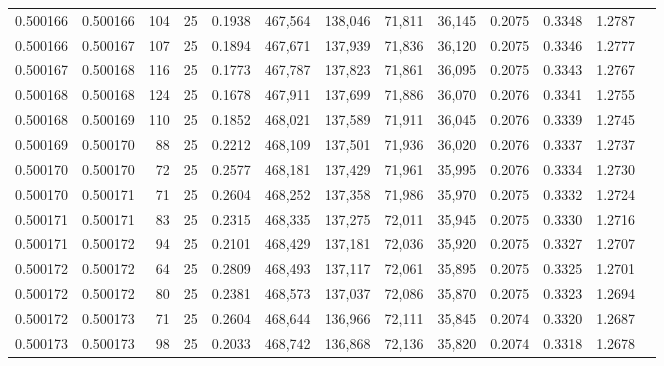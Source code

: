 \begin{tabular}{rrrrrrrrrrrrr}
0.500166 & 0.500166 & 104 &  25 &                                     0.1938 & 467,564 & 138,046 &  71,811 &  36,145 & 0.2075 & 0.3348 & 1.2787 \\
0.500166 & 0.500167 & 107 &  25 &                                     0.1894 & 467,671 & 137,939 &  71,836 &  36,120 & 0.2075 & 0.3346 & 1.2777 \\
0.500167 & 0.500168 & 116 &  25 &                                     0.1773 & 467,787 & 137,823 &  71,861 &  36,095 & 0.2075 & 0.3343 & 1.2767 \\
0.500168 & 0.500168 & 124 &  25 &                                     0.1678 & 467,911 & 137,699 &  71,886 &  36,070 & 0.2076 & 0.3341 & 1.2755 \\
0.500168 & 0.500169 & 110 &  25 &                                     0.1852 & 468,021 & 137,589 &  71,911 &  36,045 & 0.2076 & 0.3339 & 1.2745 \\
0.500169 & 0.500170 &  88 &  25 &                                     0.2212 & 468,109 & 137,501 &  71,936 &  36,020 & 0.2076 & 0.3337 & 1.2737 \\
0.500170 & 0.500170 &  72 &  25 &                                     0.2577 & 468,181 & 137,429 &  71,961 &  35,995 & 0.2076 & 0.3334 & 1.2730 \\
0.500170 & 0.500171 &  71 &  25 &                                     0.2604 & 468,252 & 137,358 &  71,986 &  35,970 & 0.2075 & 0.3332 & 1.2724 \\
0.500171 & 0.500171 &  83 &  25 &                                     0.2315 & 468,335 & 137,275 &  72,011 &  35,945 & 0.2075 & 0.3330 & 1.2716 \\
0.500171 & 0.500172 &  94 &  25 &                                     0.2101 & 468,429 & 137,181 &  72,036 &  35,920 & 0.2075 & 0.3327 & 1.2707 \\
0.500172 & 0.500172 &  64 &  25 &                                     0.2809 & 468,493 & 137,117 &  72,061 &  35,895 & 0.2075 & 0.3325 & 1.2701 \\
0.500172 & 0.500172 &  80 &  25 &                                     0.2381 & 468,573 & 137,037 &  72,086 &  35,870 & 0.2075 & 0.3323 & 1.2694 \\
0.500172 & 0.500173 &  71 &  25 &                                     0.2604 & 468,644 & 136,966 &  72,111 &  35,845 & 0.2074 & 0.3320 & 1.2687 \\
0.500173 & 0.500173 &  98 &  25 &                                     0.2033 & 468,742 & 136,868 &  72,136 &  35,820 & 0.2074 & 0.3318 & 1.2678 \\

\end{tabular}
